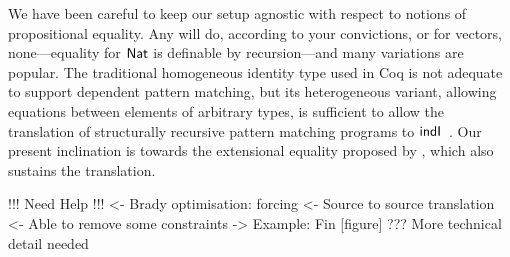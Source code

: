 We have been careful to keep our setup agnostic with respect to
notions of propositional equality. Any will do, according to your
convictions, or for vectors, none---equality for \(\Nat\) is definable by
recursion---and many variations are popular. The traditional
homogeneous identity type used in Coq is not adequate to support
dependent pattern matching, but its heterogeneous variant, allowing
equations between elements of arbitrary types, is sufficient to
allow the translation of structurally recursive pattern matching
programs to \(\F{indI}\)~\cite{goguen:pattern-matching}. Our present
inclination is towards the extensional equality proposed by
\citet{altenkirch:ott}, which also sustains the translation.

\begin{wstructure}
!!! Need Help !!!
<- Brady optimisation: forcing
    <- Source to source translation
    <- Able to remove some constraints
    -> Example: Fin [figure]
    ??? More technical detail needed
\end{wstructure}

